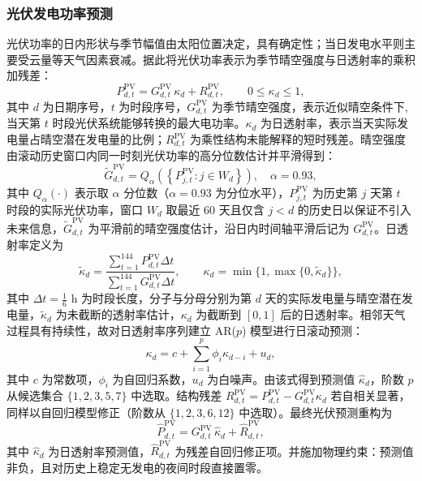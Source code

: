 \documentclass[withoutpreface,bwprint]{cumcmthesis}
\begin{document}
\subsubsection{光伏发电功率预测}

光伏功率的日内形状与季节幅值由太阳位置决定，具有确定性；当日发电水平则主要受云量等天气因素衰减。据此将光伏功率表示为季节晴空强度与日透射率的乘积加残差：
\begin{equation}
	P^{\mathrm{PV}}_{d,t}=G^{\mathrm{PV}}_{d,t}\,\kappa_d+R^{\mathrm{PV}}_{d,t},\qquad 0\le\kappa_d\le 1,
	\label{eq:q2pv2term}
\end{equation}
其中 $d$ 为日期序号，$t$ 为时段序号，$G^{\mathrm{PV}}_{d,t}$ 为季节晴空强度，表示近似晴空条件下,当天第 $t$ 时段光伏系统能够转换的最大电功率。$\kappa_d$ 为日透射率，表示当天实际发电量占晴空潜在发电量的比例；$R^{\mathrm{PV}}_{d,t}$ 为乘性结构未能解释的短时残差。晴空强度由滚动历史窗口内同一时刻光伏功率的高分位数估计并平滑得到：
\begin{equation}
	\tilde G^{\mathrm{PV}}_{d,t}=Q_{\alpha}\!\left(\left\{P^{\mathrm{PV}}_{j,t}: j\in W_d\right\}\right),\quad \alpha=0.93,
	\label{eq:q2clear}
\end{equation}
其中 $Q_\alpha(\cdot)$ 表示取 $\alpha$ 分位数（$\alpha=0.93$ 为分位水平），$P^{\mathrm{PV}}_{j,t}$ 为历史第 $j$ 天第 $t$ 时段的实际光伏功率，窗口 $W_d$ 取最近 60 天且仅含 $j<d$ 的历史日以保证不引入未来信息，$\tilde G^{\mathrm{PV}}_{d,t}$ 为平滑前的晴空强度估计，沿日内时间轴平滑后记为 $G^{\mathrm{PV}}_{d,t}$。日透射率定义为
\begin{equation}
	\tilde\kappa_d=\dfrac{\sum_{t=1}^{144}P^{\mathrm{PV}}_{d,t}\Delta t}{\sum_{t=1}^{144}G^{\mathrm{PV}}_{d,t}\Delta t},\qquad
	\kappa_d=\min\{1,\max\{0,\tilde\kappa_d\}\},
	\label{eq:q2kappa}
\end{equation}
其中 $\Delta t=\frac{1}{6}$ h 为时段长度，分子与分母分别为第 $d$ 天的实际发电量与晴空潜在发电量，$\tilde\kappa_d$ 为未截断的透射率估计，$\kappa_d$ 为截断到 $[0,1]$ 后的日透射率。相邻天气过程具有持续性，故对日透射率序列建立 AR($p$) 模型进行日滚动预测：
\begin{equation}
	\kappa_d=c+\sum_{i=1}^{p}\phi_i\kappa_{d-i}+u_d,
	\label{eq:q2kappaAR}
\end{equation}
其中 $c$ 为常数项，$\phi_i$ 为自回归系数，$u_d$ 为白噪声。由该式得到预测值 $\hat\kappa_d$，阶数 $p$ 从候选集合 $\{1,2,3,5,7\}$ 中选取。结构残差 $R^{\mathrm{PV}}_{d,t}=P^{\mathrm{PV}}_{d,t}-G^{\mathrm{PV}}_{d,t}\kappa_d$ 若自相关显著，同样以自回归模型修正（阶数从 $\{1,2,3,6,12\}$ 中选取）。最终光伏预测重构为
\vspace*{-5pt}
\begin{equation}
	\hat P^{\mathrm{PV}}_{d,t}=G^{\mathrm{PV}}_{d,t}\,\hat\kappa_d+\hat R^{\mathrm{PV}}_{d,t},
	\label{eq:q2pvpred}
\end{equation}
\vspace*{-5pt}
其中 $\hat\kappa_d$ 为日透射率预测值，$\hat R^{\mathrm{PV}}_{d,t}$ 为残差自回归修正项。并施加物理约束：预测值非负，且对历史上稳定无发电的夜间时段直接置零。
\end{document}
